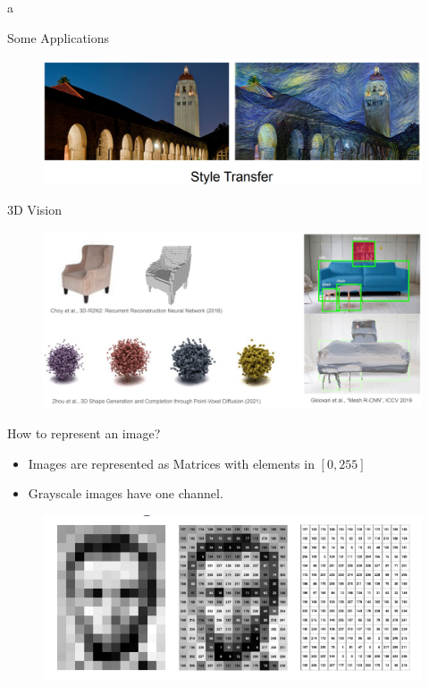 a\documentclass[10pt]{beamer}
\theoremstyle{remark}
\theoremstyle{definition}
\begin{document}
\begin{frame}[allowframebreaks]{Some Applications}
\framebreak

\begin{figure}
\centering
\includegraphics[width=1.0\textwidth,height=0.9\textheight,keepaspectratio]{./images/cv_12.png}
\end{figure}

\framebreak

\centering
3D Vision
\begin{figure}
\centering
\includegraphics[width=1.0\textwidth,height=0.9\textheight,keepaspectratio]{./images/cv_13.png}
\end{figure}
    
\end{frame}


\begin{frame}{How to represent an image?}
\begin{itemize}
    \item Images are represented as Matrices with elements in $[0,255]$
    \item Grayscale images have one channel.
\end{itemize}
\begin{figure}
\centering
\includegraphics[width=1.0\textwidth,height=0.7\textheight,keepaspectratio]{./images/represent_image.png}
\end{figure}

\end{frame}
\end{document}
